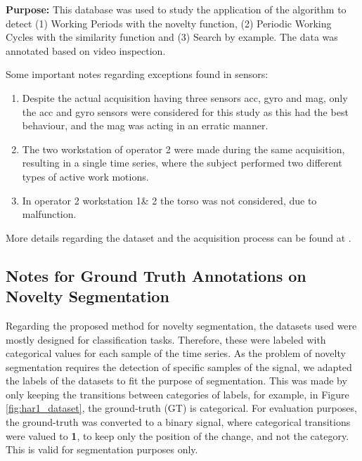 \textbf{Purpose:} This database was used to study the application of the algorithm to detect (1) Working Periods with the novelty function, (2) Periodic Working Cycles with the similarity function and (3) Search by example. The data was annotated based on video inspection.
\par
Some important notes regarding exceptions found in sensors:
\begin{enumerate}
\item Despite the actual acquisition having three sensors \gls{acc}, \gls{gyro} and \gls{mag}, only the \gls{acc} and \gls{gyro} sensors were considered for this study as this had the best behaviour, and the \gls{mag} was acting in an erratic manner.
\item The two workstation of operator 2 were made during the same acquisition, resulting in a single time series, where the subject performed two different types of active work motions.
\item In operator 2 workstation 1\& 2 the torso was not considered, due to malfunction.
\end{enumerate}
More details regarding the dataset and the acquisition process can be found at \cite{sara2019, santos}.


\subsection{Notes for Ground Truth Annotations on Novelty Segmentation}

Regarding the proposed method for novelty segmentation, the datasets used were mostly designed for classification tasks. Therefore, these were labeled with categorical values for each sample of the time series. As the problem of novelty segmentation requires the detection of specific samples of the signal, we adapted the labels of the datasets to fit the purpose of segmentation. This was made by only keeping the transitions between categories of labels, for example, in Figure \ref{fig:har1_dataset}, the ground-truth (GT) is categorical. For evaluation purposes, the ground-truth was converted to a binary signal, where categorical transitions were valued to \textbf{1}, to keep only the position of the change, and not the category. This is valid for segmentation purposes only.